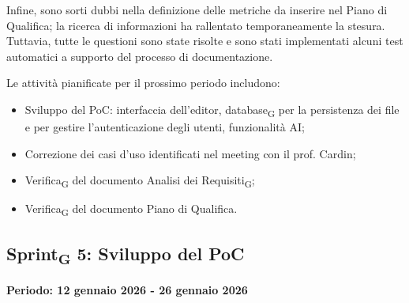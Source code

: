 \documentclass[11pt,a4paper]{article}
\newcommand{\gls}[1]{#1\textsubscript{G}}
\begin{document}
Infine, sono sorti dubbi nella definizione delle metriche da inserire nel Piano di Qualifica; la ricerca di informazioni ha rallentato temporaneamente la stesura. Tuttavia, tutte le questioni sono state risolte e sono stati implementati alcuni test automatici a supporto del processo di documentazione.

Le attività pianificate per il prossimo periodo includono:
\begin{itemize}
    \item Sviluppo del PoC: interfaccia dell'editor, \gls{database} per la persistenza dei file e per gestire l'autenticazione degli utenti, funzionalità AI;
    \item Correzione dei casi d'uso identificati nel meeting con il prof. Cardin;
    \item \gls{Verifica} del documento \gls{Analisi dei Requisiti};
    \item \gls{Verifica} del documento Piano di Qualifica.
\end{itemize}

\newpage
\subsection{\gls{Sprint} 5: Sviluppo del PoC}
{\textbf{Periodo: 12 gennaio 2026 - 26 gennaio 2026}\par}
\end{document}
